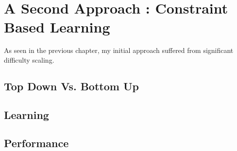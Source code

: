 \chapter{A Second Approach : Constraint Based Learning}

As seen in the previous chapter, my initial approach suffered from significant difficulty scaling.

\section{Top Down Vs. Bottom Up}

\section{Learning}

\section{Performance}



\pagebreak
%
%